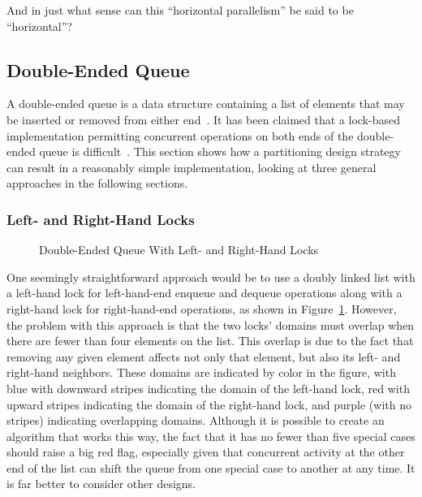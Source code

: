 \QuickQuiz{}
	And in just what sense can this ``horizontal parallelism'' be
	said to be ``horizontal''?
 \QuickQuizEnd

\subsection{Double-Ended Queue}
\label{sec:SMPdesign:Double-Ended Queue}

A double-ended queue is a data structure containing a list of elements
that may be inserted or removed from either end~\cite{Knuth73}.
It has been claimed that a lock-based implementation permitting
concurrent operations on both ends of the double-ended queue is
difficult~\cite{DanGrossman2007TMGCAnalogy}.
This section shows how a partitioning design strategy can result
in a reasonably simple implementation, looking at three
general approaches in the following sections.

\subsubsection{Left- and Right-Hand Locks}
\label{sec:SMPdesign:Left- and Right-Hand Locks}

\begin{figure}[tb]
\centering
{}
\caption{Double-Ended Queue With Left- and Right-Hand Locks}
\label{fig:SMPdesign:Double-Ended Queue With Left- and Right-Hand Locks}
\end{figure}

One seemingly straightforward approach would be to use a doubly
linked list with a left-hand lock
for left-hand-end enqueue and dequeue operations along with a right-hand
lock for right-hand-end operations, as shown in
Figure~\ref{fig:SMPdesign:Double-Ended Queue With Left- and Right-Hand Locks}.
However, the problem with this approach is that the two locks'
domains must overlap when there are fewer than four elements on the
list.
This overlap is due to the fact that removing any given element affects
not only that element, but also its left- and right-hand neighbors.
These domains are indicated by color in the figure, with blue
with downward stripes indicating
the domain of the left-hand lock, red with upward stripes
indicating the domain of the right-hand
lock, and purple (with no stripes) indicating overlapping domains.
Although it is possible to create an algorithm that works this way,
the fact that it has no fewer than five special cases should raise
a big red flag, especially given that concurrent activity at the other
end of the list can shift the queue from one special case to another
at any time.
It is far better to consider other designs.

